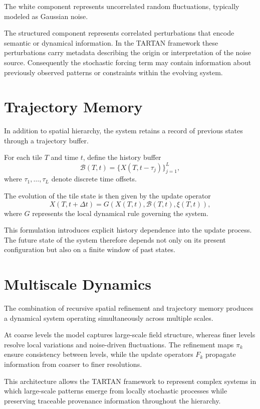 \documentclass[11pt, openany]{book}
\theoremstyle{plain}
\theoremstyle{definition}
\theoremstyle{remark}
\begin{document}
The white component represents uncorrelated random fluctuations,
typically modeled as Gaussian noise.

The structured component represents correlated perturbations that
encode semantic or dynamical information.  In the TARTAN framework these
perturbations carry metadata describing the origin or interpretation of
the noise source.  Consequently the stochastic forcing term may contain
information about previously observed patterns or constraints within
the evolving system.

\section{Trajectory Memory}

In addition to spatial hierarchy, the system retains a record of
previous states through a trajectory buffer.

For each tile $T$ and time $t$, define the history buffer
\[
\mathcal{B}(T,t)
=
\{X(T,t-\tau_j)\}_{j=1}^{L},
\]
where $\tau_1,\dots,\tau_L$ denote discrete time offsets.

The evolution of the tile state is then given by the update operator
\[
X(T,t+\Delta t)
=
G\!\left(
X(T,t),
\mathcal{B}(T,t),
\xi(T,t)
\right),
\]
where $G$ represents the local dynamical rule governing the system.

This formulation introduces explicit history dependence into the update
process.  The future state of the system therefore depends not only on
its present configuration but also on a finite window of past states.

\section{Multiscale Dynamics}

The combination of recursive spatial refinement and trajectory memory
produces a dynamical system operating simultaneously across multiple
scales.

At coarse levels the model captures large-scale field structure,
whereas finer levels resolve local variations and noise-driven
fluctuations.  The refinement maps $\pi_k$ ensure consistency between
levels, while the update operators $F_k$ propagate information from
coarser to finer resolutions.

This architecture allows the TARTAN framework to represent complex
systems in which large-scale patterns emerge from locally stochastic
processes while preserving traceable provenance information throughout
the hierarchy.
\end{document}
